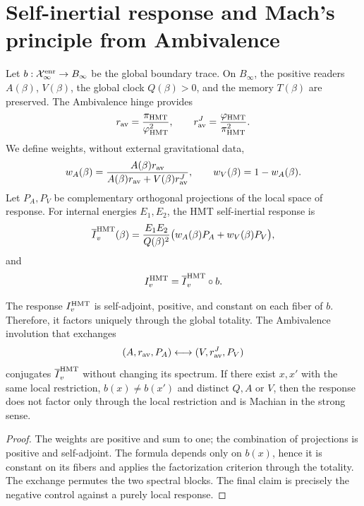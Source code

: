 \section{Self-inertial response and Mach's principle from Ambivalence}
\label{sec:hmtf2-mach-ambivalencia}

Let \(b:\mathcal X_\infty^{\rm enr}\to B_\infty\) be the global boundary
trace. On \(B_\infty\), the positive readers
\(A(\beta)\), \(V(\beta)\), the global clock \(Q(\beta)>0\), and the memory
\(T(\beta)\) are preserved. The Ambivalence hinge provides
\[
 r_{\rm av}=\frac{\pi_{\rm HMT}}{\varphi_{\rm HMT}^2},
 \qquad
 r_{\rm av}^J=\frac{\varphi_{\rm HMT}}{\pi_{\rm HMT}^2}.
\]
We define weights, without external gravitational data,
\[
 w_A(\beta)
 =\frac{A(\beta)r_{\rm av}}
 {A(\beta)r_{\rm av}+V(\beta)r_{\rm av}^J},
 \qquad
 w_V(\beta)=1-w_A(\beta).
\]
Let \(P_A,P_V\) be complementary orthogonal projections of the local space
of response. For internal energies \(E_1,E_2\), the HMT
self-inertial response is
\[
 \overline I_v^{\rm HMT}(\beta)
 =\frac{E_1E_2}{Q(\beta)^2}
 \bigl(w_A(\beta)P_A+w_V(\beta)P_V\bigr),
\]
and
\[
 I_v^{\rm HMT}
 =\overline I_v^{\rm HMT}\circ b.
\]

\begin{theorem}
\label{thm:hmtf2-respuesta-mach}
The response \(I_v^{\rm HMT}\) is self-adjoint, positive, and constant on each
fiber of \(b\). Therefore, it factors uniquely through the global totality.
The Ambivalence involution that exchanges
\[
 (A,r_{\rm av},P_A)\longleftrightarrow
 (V,r_{\rm av}^J,P_V)
\]
conjugates \(\overline I_v^{\rm HMT}\) without changing its spectrum. If there exist
\(x,x'\) with the same local restriction, \(b(x)\ne b(x')\) and distinct
\(Q,A\) or \(V\), then the response does not factor only through the local
restriction and is Machian in the strong sense.
\end{theorem}

\begin{proof}
The weights are positive and sum to one; the combination of projections is
positive and self-adjoint. The formula depends only on \(b(x)\), hence it is
constant on its fibers and applies the factorization criterion through the
totality. The exchange permutes the two spectral blocks. The final
claim is precisely the negative control against a purely
local response.
\end{proof}


